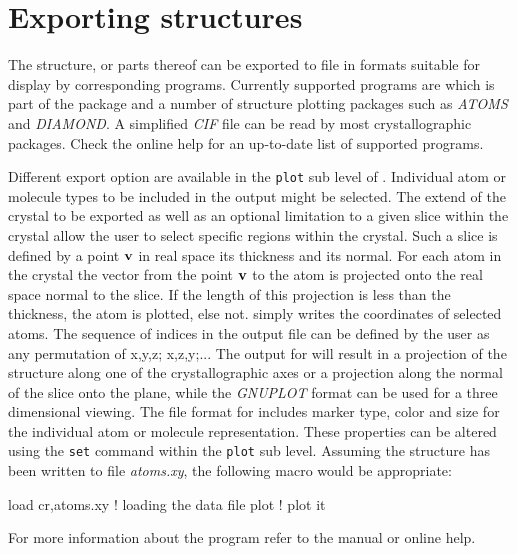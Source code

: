 
\section{Exporting structures \label{struc-expo}}

The structure, or parts thereof can be exported to file in formats
suitable for display by corresponding programs.  Currently supported
programs are \Kuplot which is part of the \Discus package
and a number of structure plotting packages such as {\it ATOMS} and
{\it DIAMOND}.  A simplified {\it CIF} file can be read by most
crystallographic packages. 
Check the online help for an up-to-date list of
supported programs.
\par

Different export option are available in the {\tt plot} sub level of
\discus.  Individual atom or molecule types to be included in
the output might be selected.  The extend of the crystal to be
exported as well as an optional limitation to a given slice within
the crystal allow the user to select specific regions within the
crystal.  Such a slice is defined by a point ${\bf v}$ in real space
its thickness and its normal. For each atom in the crystal the
vector from the point ${\bf v}$ to the atom is projected onto the
real space normal to the slice. If the length of this projection is
less than the thickness, the atom is plotted, else not. \Discus
simply writes the coordinates of selected atoms.  The sequence of
indices in the output file can be defined by the user as any
permutation of x,y,z; x,z,y;...  The output for \Kuplot will
result in a projection of the structure along one of the
crystallographic axes or a projection along the normal of the slice
onto the plane, while the {\it GNUPLOT} format can be used for a
three dimensional viewing.  The file format for \Kuplot
includes marker type, color and size for the individual atom or
molecule representation.  These properties can be altered using the
{\tt set} command within the {\tt plot} sub level.  Assuming the
structure has been written to file {\it atoms.xy}, the following
\Kuplot macro would be appropriate:

\begin{MacVerbatim}
    load cr,atoms.xy    ! loading the data file
    plot                ! plot it
\end{MacVerbatim}

For more information about the program \Kuplot refer to the
\Kuplot manual or online help.

